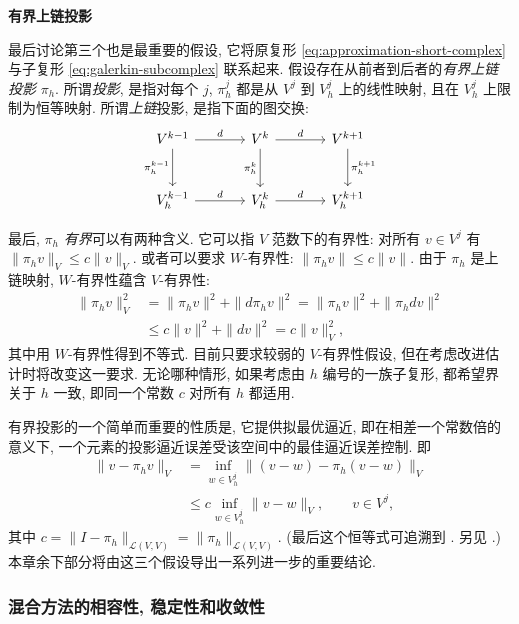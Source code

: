 \medskip\noindent\textbf{{有界上链投影}}\par
{最后讨论第三个也是最重要的假设, 它将原复形 \eqref{eq:approximation-short-complex} 与子复形 \eqref{eq:galerkin-subcomplex} 联系起来. 假设存在从前者到后者的\emph{有界上链投影} $\pi_h$. 所谓\emph{投影}, 是指对每个 $j$, $\pi_h^j$ 都是从 $V^j$ 到 $V_h^j$ 上的线性映射, 且在 $V_h^j$ 上限制为恒等映射. 所谓\emph{上链}投影, 是指下面的图交换:}
\[
\begin{tikzcd}[column sep=large,row sep=large]
V^{k-1}\arrow[r,"d"]\arrow[d,"\pi_h^{k-1}"']&V^k\arrow[r,"d"]\arrow[d,"\pi_h^k"']&V^{k+1}\arrow[d,"\pi_h^{k+1}"]\\
V_h^{k-1}\arrow[r,"d"]&V_h^k\arrow[r,"d"]&V_h^{k+1}
\end{tikzcd}
\]

{最后, $\pi_h$ \emph{有界}可以有两种含义. 它可以指 $V$ 范数下的有界性: 对所有 $v\in V^j$ 有 $\|\pi_hv\|_V\leq c\|v\|_V$. 或者可以要求 $W$-有界性: $\|\pi_hv\|\leq c\|v\|$. 由于 $\pi_h$ 是上链映射, $W$-有界性蕴含 $V$-有界性:}
\[
\begin{aligned}
\|\pi_hv\|_V^2&=\|\pi_hv\|^2+\|d\pi_hv\|^2=\|\pi_hv\|^2+\|\pi_hdv\|^2\\
&\leq c\|v\|^2+\|dv\|^2=c\|v\|_V^2,
\end{aligned}
\]
{其中用 $W$-有界性得到不等式. 目前只要求较弱的 $V$-有界性假设, 但在考虑改进估计时将改变这一要求. 无论哪种情形, 如果考虑由 $h$ 编号的一族子复形, 都希望界关于 $h$ 一致, 即同一个常数 $c$ 对所有 $h$ 都适用.}

{有界投影的一个简单而重要的性质是, 它提供拟最优逼近, 即在相差一个常数倍的意义下, 一个元素的投影逼近误差受该空间中的最佳逼近误差控制. 即}
\begin{equation}\label{eq:projection-quasioptimality}
\begin{aligned}
\|v-\pi_hv\|_V&=\inf_{w\in V_h^j}\|(v-w)-\pi_h(v-w)\|_V\\
&\leq c\inf_{w\in V_h^j}\|v-w\|_V,\qquad v\in V^j,
\end{aligned}
\end{equation}
{其中 $c=\|I-\pi_h\|_{\mathcal L(V,V)}=\|\pi_h\|_{\mathcal L(V,V)}$. (最后这个恒等式可追溯到 . 另见 .) 本章余下部分将由这三个假设导出一系列进一步的重要结论.}

\subsubsection{{混合方法的相容性, 稳定性和收敛性}}\label{subsec:mixed-consistency-stability}


